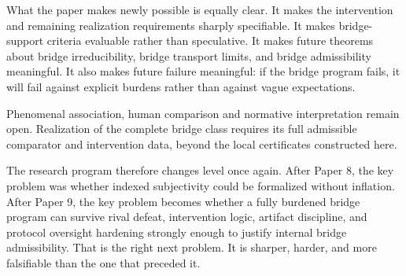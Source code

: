\documentclass[11pt,a4paper]{article}
\theoremstyle{definition}
\begin{document}
What the paper makes newly possible is equally clear. It makes the intervention and remaining realization requirements sharply specifiable. It makes bridge-support criteria evaluable rather than speculative. It makes future theorems about bridge irreducibility, bridge transport limits, and bridge admissibility meaningful. It also makes future failure meaningful: if the bridge program fails, it will fail against explicit burdens rather than against vague expectations.

Phenomenal association, human comparison and normative interpretation remain open. Realization of the complete bridge class requires its full admissible comparator and intervention data, beyond the local certificates constructed here.

The research program therefore changes level once again. After Paper 8, the key problem was whether indexed subjectivity could be formalized without inflation. After Paper 9, the key problem becomes whether a fully burdened bridge program can survive rival defeat, intervention logic, artifact discipline, and protocol oversight hardening strongly enough to justify internal bridge admissibility. That is the right next problem. It is sharper, harder, and more falsifiable than the one that preceded it.

\appendix
\end{document}
